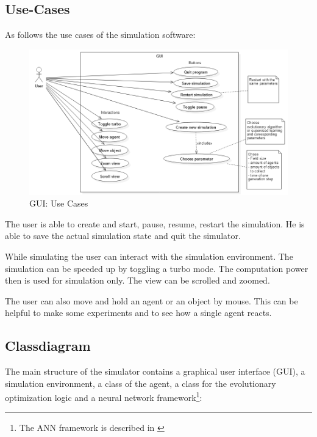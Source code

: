\documentclass[10pt,a4paper,DIV=11]{scrreprt}
\begin{document}
\subsection{Use-Cases}
As follows the use cases of the simulation software:

\begin{center}
	\begin{figure}[H]
		\centering
		\includegraphics[width=1.0\textwidth,scale=1.0]{files/Use-case-GUI.png}
		\caption{GUI: Use Cases}
		\label{fig:usecases}
	\end{figure}
\end{center}

The user is able to create and start, pause, resume, restart the simulation.
He is able to save the actual simulation state and quit the simulator.

While simulating the user can interact with the simulation environment. The simulation can be speeded up by toggling a turbo mode. The computation power then is used for simulation only. The view can be scrolled and zoomed.

The user can also move and hold an agent or an object by mouse. This can be helpful to make some experiments and to see how a single agent reacts.

\newpage
\subsection{Classdiagram}

The main structure of the simulator contains a graphical user interface (GUI), a simulation environment, a class of the agent, a class for the evolutionary optimization logic and a neural network framework\footnote{The ANN framework is described in \cite{Jona}}:
\end{document}
